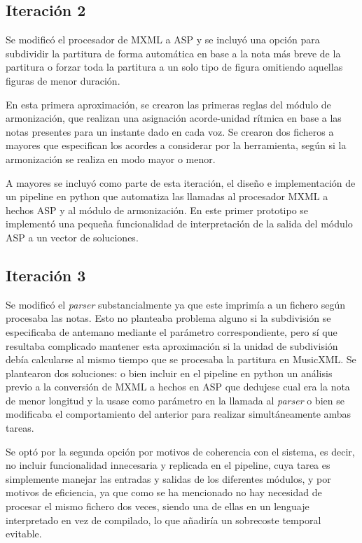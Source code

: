 \subsection{Iteración 2}
\label{sec:second_iteration}
Se modificó el procesador de MXML a ASP y se incluyó una opción para subdividir la partitura de forma automática en base a la nota más breve de la partitura o forzar toda la partitura a un solo tipo de figura omitiendo aquellas figuras de menor duración.

En esta primera aproximación, se crearon las primeras reglas del módulo de armonización, que realizan una asignación acorde-unidad rítmica en base a las notas presentes para un instante dado en cada voz. Se crearon dos ficheros a mayores que especifican los acordes a considerar por la herramienta, según si la armonización se realiza en modo mayor o menor. 

A mayores se incluyó como parte de esta iteración, el diseño e implementación de un pipeline en python que automatiza las llamadas al procesador MXML a hechos ASP y al módulo de armonización. En este primer prototipo se implementó una pequeña funcionalidad de interpretación de la salida del módulo ASP a un vector de soluciones.


\subsection{Iteración 3}
\label{subsec:third_iteration}
Se modificó el \textit{parser} substancialmente ya que este imprimía a un fichero según procesaba las notas. Esto no planteaba problema alguno si la subdivisión se especificaba de antemano mediante el parámetro correspondiente, pero sí que resultaba complicado mantener esta aproximación si la unidad de subdivisión debía calcularse al mismo tiempo que se procesaba la partitura en MusicXML. Se plantearon dos soluciones: o bien incluir en el pipeline en python un análisis previo a la conversión de MXML a hechos en ASP que dedujese cual era la nota de menor longitud y la usase como parámetro en la llamada al \textit{parser} o bien se modificaba el comportamiento del anterior para realizar simultáneamente ambas tareas. 

Se optó por la segunda opción por motivos de coherencia con el sistema, es decir, no incluir funcionalidad innecesaria y replicada en el pipeline, cuya tarea es simplemente manejar las entradas y salidas de los diferentes módulos, y por motivos de eficiencia, ya que como se ha mencionado no hay necesidad de procesar el mismo fichero dos veces, siendo una de ellas en un lenguaje interpretado en vez de compilado, lo que añadiría un sobrecoste temporal evitable.

